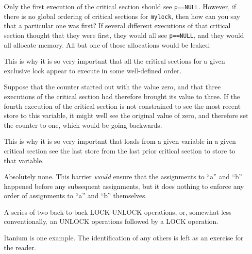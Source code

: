 	Only the first execution of the critical section should
	see {\tt p==NULL}.
	However, if there is no global ordering of critical sections for
	{\tt mylock}, then how can you say that a particular one was
	first?
	If several different executions of that critical section thought
	that they were first, they would all see {\tt p==NULL}, and
	they would all allocate memory.
	All but one of those allocations would be leaked.
	
	This is why it is so very important that all the critical sections
	for a given exclusive lock appear to execute in some well-defined
	order.


	Suppose that the counter started out with the value zero,
	and that three executions of the critical section had therefore
	brought its value to three.
	If the fourth execution of the critical section is not constrained
	to see the most recent store to this variable, it might well see
	the original value of zero, and therefore set the counter to
	one, which would be going backwards.
	
	This is why it is so very important that loads from a given variable
	in a given critical
	section see the last store from the last prior critical section to
	store to that variable.


	Absolutely none.  This barrier {\em would} ensure that the
	assignments to ``a'' and ``b'' happened before any subsequent
	assignments, but it does nothing to enforce any order of
	assignments to ``a'' and ``b'' themselves.


	A series of two back-to-back LOCK-UNLOCK operations, or, somewhat
	less conventionally, an UNLOCK operations followed by a LOCK
	operation.


	Itanium is one example.
	The identification of any others is left as an
	exercise for the reader.

